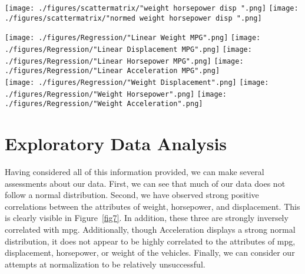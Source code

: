 \documentclass[10pt, conference, compsocconf]{IEEEtran}
\begin{document}
\begin{figure*}[!ht]
	\vspace{-6mm}
	\centering
	\texttt{[image: ./figures/scattermatrix/"weight horsepower disp ".png]}
	\texttt{[image: ./figures/scattermatrix/"normed weight horsepower disp ".png]}\\

	\caption{Original data (left) and normalized data (right) scatter matrix plots of weight, displacement, and horsepower.}
	\label{fig7}
\end{figure*}


\begin{figure*}[ht]
	\vspace{-2mm}
	\centering
	\texttt{[image: ./figures/Regression/"Linear Weight MPG".png]}
	\texttt{[image: ./figures/Regression/"Linear Displacement MPG".png]}
	\texttt{[image: ./figures/Regression/"Linear Horsepower MPG".png]}
	\texttt{[image: ./figures/Regression/"Linear Acceleration MPG".png]}\\
	
	\centering
	\texttt{[image: ./figures/Regression/"Weight Displacement".png]}
	\texttt{[image: ./figures/Regression/"Weight Horsepower".png]}
	\texttt{[image: ./figures/Regression/"Weight Acceleration".png]}\\
	
	\caption{Binary linear regression analysis of mpg (top) and weight(bottom).}
	\label{fig8}
\end{figure*}

\section{Exploratory Data Analysis}\label{eda}

Having considered all of this information provided, we can make several assessments about our data. First, we can see that much of our data does not follow a normal distribution. Second, we have observed strong positive correlations between the attributes of weight, horsepower, and displacement. This is clearly visible in Figure~\ref{fig7}. In addition, these three are strongly inversely correlated with mpg. Additionally, though Acceleration displays a strong normal distribution, it does not appear to be highly correlated to the attributes of mpg, displacement, horsepower, or weight of the vehicles. Finally, we can consider our attempts at normalization to be relatively unsuccessful. 
\end{document}
